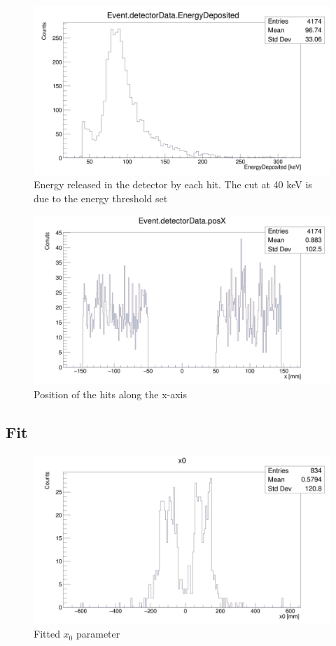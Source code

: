 \documentclass[10pt, a4paper, twocolumn]{article} %
\begin{document}
\begin{figure}[h!]
    \centering
    \includegraphics[width=0.8 \textwidth]{img/energy.jpg}
    \caption{Energy released in the detector by each hit. The cut at 40 keV is due to the energy threshold set}
    \label{fig:energy}
\end{figure}
    
\begin{figure}[h!]
    \centering
    \includegraphics[width=0.8 \textwidth]{img/posx.jpg}
    \caption{Position of the hits along the x-axis}
    \label{fig:posX}
\end{figure}
\newpage
\subsection{Fit}

\begin{figure}[h!]
    \centering
    \includegraphics[width=0.8 \textwidth]{img/x0.jpg}
    \caption{Fitted $x_0$ parameter}
    \label{fig:x0}
\end{figure}
\end{document}
